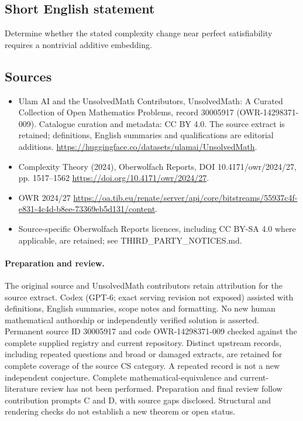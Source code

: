 \documentclass[11pt]{article}
\begin{document}
\subsection{Short English statement}
Determine whether the stated complexity change near perfect satisfiability requires a nontrivial additive embedding.
\subsection{Sources}
\begin{itemize}
\item[\hypertarget{source:30005917:1}{S1}] Ulam AI and the UnsolvedMath Contributors, UnsolvedMath: A Curated Collection of Open Mathematics Problems, record 30005917 (OWR-14298371-009). Catalogue curation and metadata: CC BY 4.0. The source extract is retained; definitions, English summaries and qualifications are editorial additions.
\url{https://huggingface.co/datasets/ulamai/UnsolvedMath}.
\item[\hypertarget{source:30005917:2}{S2}] Complexity Theory (2024), Oberwolfach Reports, DOI 10.4171/owr/2024/27, pp. 1517--1562
\url{https://doi.org/10.4171/owr/2024/27}.
\item[\hypertarget{source:30005917:3}{S3}] OWR 2024/27
\url{https://oa.tib.eu/renate/server/api/core/bitstreams/55937c4f-e831-4c4d-b8ee-73369eb5d131/content}.
\item Source-specific Oberwolfach Reports licences, including CC BY-SA 4.0 where applicable, are retained; see THIRD\_PARTY\_NOTICES.md.
\end{itemize}
\paragraph{Preparation and review.}
The original source and UnsolvedMath contributors retain attribution for the source extract. Codex (GPT-6; exact serving revision not exposed) assisted with definitions, English summaries, scope notes and formatting. No new human mathematical authorship or independently verified solution is asserted. Permanent source ID 30005917 and code OWR-14298371-009 checked against the complete supplied registry and current repository. Distinct upstream records, including repeated questions and broad or damaged extracts, are retained for complete coverage of the source CS category. A repeated record is not a new independent conjecture. Complete mathematical-equivalence and current-literature review has not been performed. Preparation and final review follow contribution prompts C and D, with source gaps disclosed. Structural and rendering checks do not establish a new theorem or open status.
\label{end:30005917}
\end{document}
